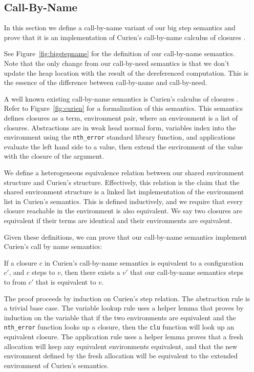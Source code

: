\subsection{Call-By-Name}

In this section we define a call-by-name variant of our big step semantics and
prove that it is an implementation of Curien's call-by-name calculus of
closures \cite{curien}. 

See Figure~\ref{fig:bigstepname} for the definition of our call-by-name
semantics. Note that the only change from our call-by-need semantics is that we
don't update the heap location with the result of the dereferenced computation.
This is the essence of the difference between call-by-name and call-by-need.

A well known existing call-by-name semantics is Curien's calculus of closures
\cite{curien}. Refer to Figure~\ref{fig:curien} for a formalization of this
semantics. This semantics defines closures as a term, environment pair, where an
environment is a list of closures. Abstractions are in weak head normal form,
variables index into the environment using the \texttt{nth\_error} standard
library function, and applications evaluate the left hand side to a value, then
extend the environment of the value with the closure of the argument. 

We define a heterogeneous equivalence relation between our shared environment
structure and Curien's structure. Effectively, this relation is the claim that
the shared environment structure is a linked list implementation of the
environment list in Curien's semantics. This is defined inductively, and we
require that every closure reachable in the environment is also equivalent.  We
say two closures are equivalent if their terms are identical and their
environments are equivalent. 

Given these definitions, we can prove that our call-by-name semantics implement
Curien's call by name semantics: 

\begin{theorem}
If a closure $c$ in Curien's call-by-name semantics is equivalent to a
configuration $c'$, and $c$ steps to $v$, then there exists a $v'$ that our
call-by-name semantics steps to from $c'$ that is equivalent to $v$.
\end{theorem}
\begin{proofoutline}
The proof proceeds by induction on Curien's step relation. The abstraction rule
is a trivial base case. The variable lookup rule uses a helper lemma that proves
by induction on the variable that if the two environments are equivalent and the
\texttt{nth\_error} function looks up a closure, then the \texttt{clu} function
will look up an equivalent closure. The application rule uses a helper lemma
proves that a fresh allocation will keep any equivalent environments equivalent,
and that the new environment defined by the fresh allocation will be equivalent
to the extended environment of Curien's semantics.
\end{proofoutline}

